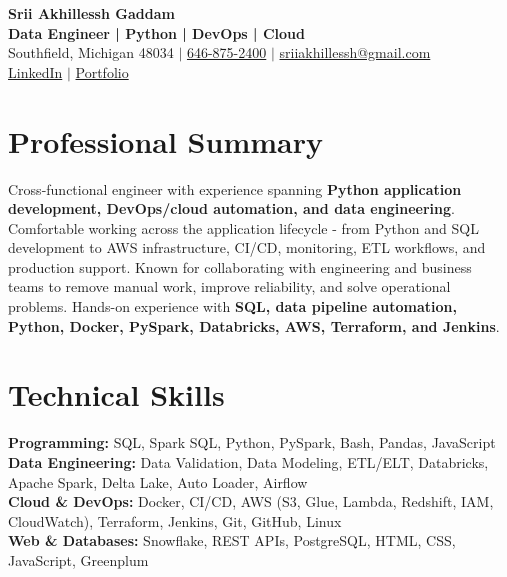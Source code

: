 \documentclass[letterpaper,10pt]{article}
\begin{document}
\fontsize{9.35pt}{10.45pt}\selectfont

\begin{center}
    {\LARGE \textbf{Srii Akhillessh Gaddam}} \\[-1pt]
    \textbf{Data Engineer | Python | DevOps | Cloud} \\[2pt]
    Southfield, Michigan 48034 $|$
    \href{tel:6468752400}{646-875-2400} $|$
    \href{mailto:sriiakhillessh@gmail.com}{sriiakhillessh@gmail.com} \\[1pt]
    \href{https://www.linkedin.com/in/srii-akhiilessh-gaddam-b48668191/}{LinkedIn} $|$
    \href{https://sriiakhillesshg.github.io/portfolio/}{Portfolio}
\end{center}
\vspace{-8pt}

\section{Professional Summary}
\small{Cross-functional engineer with experience spanning \textbf{Python application development, DevOps/cloud automation, and data engineering}. Comfortable working across the application lifecycle - from Python and SQL development to AWS infrastructure, CI/CD, monitoring, ETL workflows, and production support. Known for collaborating with engineering and business teams to remove manual work, improve reliability, and solve operational problems. Hands-on experience with \textbf{SQL, data pipeline automation, Python, Docker, PySpark, Databricks, AWS, Terraform, and Jenkins}.}

\section{Technical Skills}
\small{
\textbf{Programming:} SQL, Spark SQL, Python, PySpark, Bash, Pandas, JavaScript \\
\textbf{Data Engineering:} Data Validation, Data Modeling, ETL/ELT, Databricks, Apache Spark, Delta Lake, Auto Loader, Airflow \\
\textbf{Cloud \& DevOps:} Docker, CI/CD, AWS (S3, Glue, Lambda, Redshift, IAM, CloudWatch), Terraform, Jenkins, Git, GitHub, Linux \\
\textbf{Web \& Databases:} Snowflake, REST APIs, PostgreSQL, HTML, CSS, JavaScript, Greenplum
}

\end{document}
